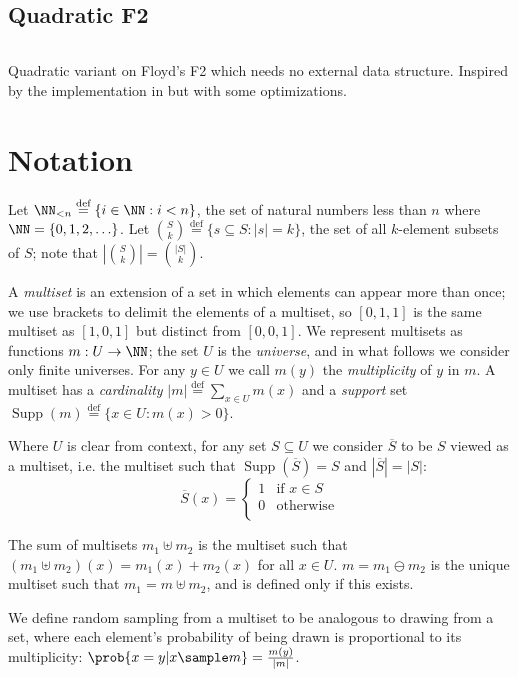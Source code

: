 \documentclass[letterpaper,luatex,11pt]{article}
\newcommand*{\defeq}{\stackrel{\text{def}}{=}}
\DeclareMathOperator{\Supp}{Supp}
\begin{document}
\subsection{Quadratic F2}
\inputminted{Python}{code/quadraticf2.py}
Quadratic variant on Floyd's F2 which needs no external data
structure. Inspired by the implementation in \cite{rust-random} but
with some optimizations.

\section{Notation}

Let \(\NN_{<n} \defeq \{i \in \NN: i < n\}\), the set of natural
numbers less than \(n\) where \(\NN = \{0, 1, 2, \ldots\}\). Let
\(\binom{S}{k} \defeq \{s \subseteq S: |s| = k\}\), the set of all
\(k\)-element subsets of \(S\); note that \(\left|\binom{S}{k}\right|
= \binom{|S|}{k}\).

A \emph{multiset} is an extension of a set in which elements can
appear more than once; we use brackets to delimit the elements of a
multiset, so $[0, 1, 1]$ is the same multiset as $[1, 0, 1]$ but
distinct from $[0, 0, 1]$. We represent multisets as functions $m: U
\rightarrow \NN$; the set $U$ is the \emph{universe}, and in what
follows we consider only finite universes. For any $y \in U$ we call
$m(y)$ the \emph{multiplicity} of $y$ in $m$. A multiset has a
\emph{cardinality} $|m| \defeq \sum_{x \in U} m(x)$ and a
\emph{support} set $\Supp(m) \defeq \{x \in U: m(x) > 0\}$.

Where $U$ is clear from context, for any set $S \subseteq U$ we
consider $\overline{S}$ to be $S$ viewed as a multiset, i.e. the
multiset such that $\Supp(\overline{S}) = S$ and $|\overline{S}| =
|S|$:
\begin{displaymath}
    \overline{S}(x) =
    \begin{cases}
        1 & \text{if $x \in S$} \\
        0 & \text{otherwise} \\
    \end{cases}
\end{displaymath}

The sum of multisets $m_1 \uplus m_2$ is the multiset such that $(m_1
\uplus m_2)(x) = m_1(x) + m_2(x)$ for all $x \in U$. $m = m_1 \ominus
m_2$ is the unique multiset such that $m_1 = m \uplus m_2$, and is
defined only if this exists.

We define random sampling from a multiset to be analogous to drawing
from a set, where each element's probability of being drawn is
proportional to its multiplicity: $\prob{x = y |x \sample m} =
\frac{m(y)}{|m|}$.
\end{document}
